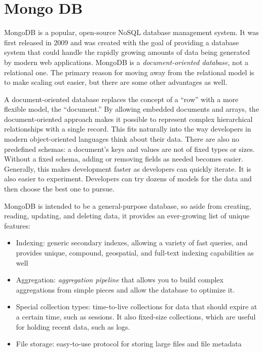 \section{Mongo DB}
\label{sec:mongo}

MongoDB is a popular, open-source NoSQL database management system. 
It was first released in 2009 and was created with the goal of providing a database system 
that could handle the rapidly growing amounts of data being generated by modern web applications. 
MongoDB is a \emph{document-oriented database}, not a relational one. The primary reason
for moving away from the relational model is to make scaling out easier, but there are
some other advantages as well.

A document-oriented database replaces the concept of a “row” with a more flexible
model, the “document.” By allowing embedded documents and arrays, the document-oriented approach 
makes it possible to represent complex hierarchical relationships
with a single record. This fits naturally into the way developers in modern object-oriented 
languages think about their data.
There are also no predefined schemas: a document’s keys and values are not of fixed
types or sizes. Without a fixed schema, adding or removing fields as needed becomes
easier. Generally, this makes development faster as developers can quickly iterate. It is
also easier to experiment. Developers can try dozens of models for the data and then
choose the best one to pursue.

MongoDB is intended to be a general-purpose database, so aside from creating, reading,
updating, and deleting data, it provides an ever-growing list of unique features:
\begin{itemize}
    \item Indexing: generic secondary indexes, allowing a variety of fast queries,
    and provides unique, compound, geospatial, and full-text indexing capabilities as
    well
    \item Aggregation: \emph{aggregation pipeline} that allows you to build complex
    aggregations from simple pieces and allow the database to optimize it.
    \item Special collection types: time-to-live collections for data that should expire at a certain
    time, such as sessions. It also fixed-size collections, which are useful for
    holding recent data, such as logs.
    \item File storage: easy-to-use protocol for storing large files and file metadata
\end{itemize}


